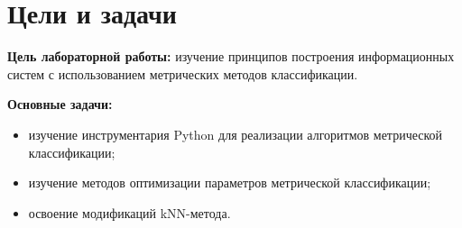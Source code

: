 \chapter*{Цели и задачи}
\label{ch:intro_sync}

\textbf{Цель лабораторной работы:} изучение принципов построения информационных систем с использованием метрических методов классификации.


\textbf{Основные задачи:}
\begin{itemize}
    \item изучение инструментария Python для реализации алгоритмов метрической классификации;
    \item изучение методов оптимизации параметров метрической классификации;
    \item освоение модификаций kNN-метода.
\end{itemize}

